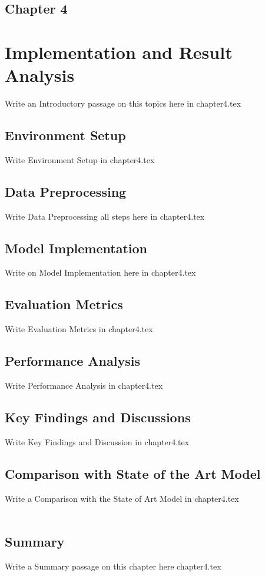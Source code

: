 \begin{center}
    \section*{\fontsize{20}{20}\selectfont Chapter 4}
\end{center}
\vspace{10mm}

\section{Implementation and Result Analysis}
Write an Introductory passage on this topics here in chapter4.tex

\subsection{Environment Setup}
Write Environment Setup in chapter4.tex

\subsection{Data Preprocessing}
Write Data Preprocessing all steps here in chapter4.tex

\subsection{Model Implementation}
Write on Model Implementation here in chapter4.tex

\subsection{Evaluation Metrics}
Write Evaluation Metrics in chapter4.tex

\subsection{Performance Analysis}
Write Performance Analysis in chapter4.tex

\subsection{Key Findings and Discussions}
Write Key Findings and Discussion in chapter4.tex

\subsection{Comparison with State of the Art Model}
Write a Comparison with the State of Art Model in chapter4.tex
\\
\\
\subsection*{Summary}
Write a Summary passage on this chapter here chapter4.tex